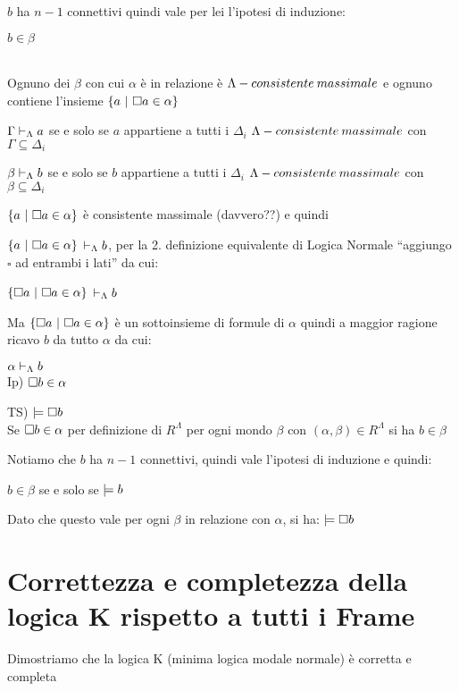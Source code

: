 $b$ ha $n-1$ connettivi quindi vale per lei l'ipotesi di induzione: 

$b\in\beta$

 \\


Ognuno dei $\beta$ con cui $\alpha$ è in relazione è $\Lambda-consistente\: massimale$
e ognuno contiene l'insieme $\{a\ |\ \boa\in\alpha\}$ 

$\Gamma\vdash_{\Lambda}a$ se e solo se $a$ appartiene a tutti i $\Delta_{i}$
$\Lambda-consistente\: massimale$ con $\Gamma\subseteq\Delta_{i}$

$\beta\vdash_{\Lambda}b$ se e solo se $b$ appartiene a tutti i $\Delta_{i}$
$\Lambda-consistente\: massimale$ con $\beta\subseteq\Delta_{i}$

$\{a\ |\ \boa\in\alpha\}$ è consistente massimale (davvero??) e quindi

$\{a\ |\ \boa\in\alpha\}$ $\vdash_{\Lambda}b$, per la 2. definizione equivalente
di Logica Normale ``aggiungo $\square$ ad entrambi i lati'' da
cui:

$\{\square a\ |\ \square a\in\alpha\}$ $\vdash_{\Lambda}b$

Ma $\{\square a\ |\ \square a\in\alpha\}$ è un sottoinsieme di formule di $\alpha$
quindi a maggior ragione ricavo $b$ da tutto $\alpha$ da cui:

$\alpha\vdash_{\Lambda}b$\\
Ip) $\square b\in\alpha$

TS) $\models\square b$\\
Se $\square b\in\alpha$ per definizione di $R^{\Lambda}$ per ogni
mondo $\beta$ con $(\alpha,\beta)\in R^{\Lambda}$ si ha $b\in\beta$

Notiamo che $b$ ha $n-1$ connettivi, quindi vale l'ipotesi di induzione
e quindi:

$ $$b\in\beta$ se e solo se $\models b$

Dato che questo vale $ $per ogni $\beta$ in relazione con $\alpha$,
si ha: $\models\square b$


\section{Correttezza e completezza della logica K rispetto a tutti i Frame}

Dimostriamo che la logica K (minima logica modale normale) è corretta
e completa

